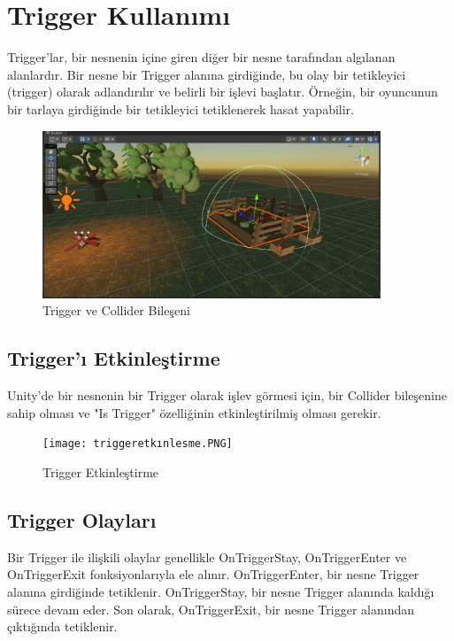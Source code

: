\documentclass{article}
\begin{document}
\section{Trigger Kullanımı}

Trigger'lar, bir nesnenin içine giren diğer bir nesne tarafından algılanan alanlardır. Bir nesne bir Trigger alanına girdiğinde, bu olay bir tetikleyici (trigger) olarak adlandırılır ve belirli bir işlevi başlatır. Örneğin, bir oyuncunun bir tarlaya girdiğinde bir tetikleyici tetiklenerek hasat yapabilir.

\begin{figure}[h]
    \centering
    \includegraphics[width=0.9\textwidth]{collider.PNG}
    \caption{Trigger ve Collider Bileşeni}
    \label{fig:resim10}
\end{figure}

\subsection{Trigger'ı Etkinleştirme}

Unity'de bir nesnenin bir Trigger olarak işlev görmesi için, bir Collider bileşenine sahip olması ve "Is Trigger" özelliğinin etkinleştirilmiş olması gerekir.

\begin{figure}[h]
    \centering
    \texttt{[image: triggeretkınlesme.PNG]}
    \caption{Trigger Etkinleştirme}
    \label{fig:resim11}
\end{figure}
\clearpage
\subsection{Trigger Olayları}

Bir Trigger ile ilişkili olaylar genellikle OnTriggerStay, OnTriggerEnter ve OnTriggerExit fonksiyonlarıyla ele alınır. OnTriggerEnter, bir nesne Trigger alanına girdiğinde tetiklenir. OnTriggerStay, bir nesne Trigger alanında kaldığı sürece devam eder. Son olarak, OnTriggerExit, bir nesne Trigger alanından çıktığında tetiklenir.
\end{document}
